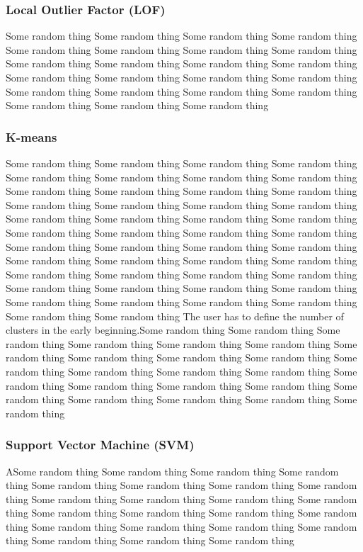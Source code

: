 \subsubsection{Local Outlier Factor (LOF)} 

Some random thing Some random thing Some random thing Some random thing Some random thing Some random thing Some random thing Some random thing Some random thing Some random thing Some random thing Some random thing Some random thing Some random thing Some random thing Some random thing Some random thing Some random thing Some random thing Some random thing Some random thing Some random thing Some random thing  
\subsubsection{ K-means}

Some random thing Some random thing Some random thing Some random thing Some random thing Some random thing Some random thing Some random thing Some random thing Some random thing Some random thing Some random thing Some random thing Some random thing Some random thing Some random thing Some random thing Some random thing Some random thing Some random thing Some random thing Some random thing Some random thing  \newline
Some random thing Some random thing Some random thing Some random thing Some random thing Some random thing Some random thing Some random thing Some random thing Some random thing Some random thing Some random thing Some random thing Some random thing Some random thing Some random thing Some random thing Some random thing Some random thing Some random thing Some random thing Some random thing Some random thing  \newline
The user has to define the number of clusters in the early beginning.Some random thing Some random thing Some random thing Some random thing Some random thing Some random thing Some random thing Some random thing Some random thing Some random thing Some random thing Some random thing Some random thing Some random thing Some random thing Some random thing Some random thing Some random thing Some random thing Some random thing Some random thing Some random thing Some random thing  
\subsubsection{Support Vector Machine (SVM)} 

ASome random thing Some random thing Some random thing Some random thing Some random thing Some random thing Some random thing Some random thing Some random thing Some random thing Some random thing Some random thing Some random thing Some random thing Some random thing Some random thing Some random thing Some random thing Some random thing Some random thing Some random thing Some random thing Some random thing  
